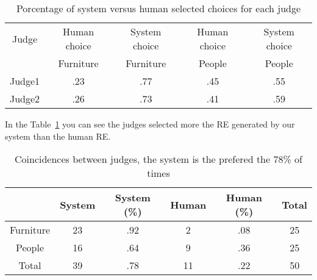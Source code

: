 \begin{table}[h!]
\begin{center}
\begin{tabular}{|c|c|c|c|c|}
\hline
Judge    & Human choice & System choice  & Human choice & System choice \\
	 &    Furniture &    Furniture   &    People    &    People \\
\hline 
Judge1   & .23       & .77      & .45  & .55  \\
Judge2   & .26       & .73      & .41  & .59  \\
\hline
\end{tabular}
\caption{Porcentage of system versus human selected choices for each judge} 
\label{system-versus-human}
\end{center}
\end{table}

In the Table~\ref{system-versus-human} you can see the judges selected more the RE generated by our system than the human RE.



\begin{table}[h!]
\begin{center}
\begin{tabular}{|c|c|c|c|c|c|}
\hline
           & System & System (\%) & Human & Human (\%) & Total\\
\hline
Furniture & 23  & .92 &  2 & .08  & 25 \\
People    & 16  & .64 & 9  & .36 & 25 \\
Total     & 39  & .78    & 11 & .22 & 50  \\
\hline
\end{tabular}
\caption{Coincidences between judges, the system is the prefered the 78\% of times} 
\label{system-better}
\end{center}
\end{table}

